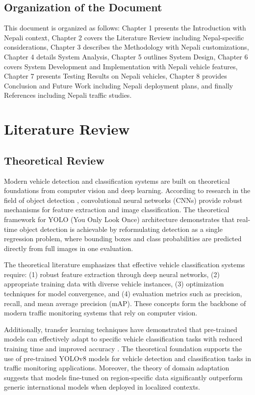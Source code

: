 \documentclass[12pt,a4paper]{report}
\begin{document}
\section{Organization of the Document}
This document is organized as follows: Chapter 1 presents the Introduction with Nepali context, Chapter 2 covers the Literature Review including Nepal-specific considerations, Chapter 3 describes the Methodology with Nepali customizations, Chapter 4 details System Analysis, Chapter 5 outlines System Design, Chapter 6 covers System Development and Implementation with Nepali vehicle features, Chapter 7 presents Testing Results on Nepali vehicles, Chapter 8 provides Conclusion and Future Work including Nepali deployment plans, and finally References including Nepali traffic studies.

\chapter{Literature Review}

\section{Theoretical Review}

Modern vehicle detection and classification systems are built on theoretical foundations from computer vision and deep learning. According to research in the field of object detection \cite{lecun2015deep}, convolutional neural networks (CNNs) provide robust mechanisms for feature extraction and image classification. The theoretical framework for YOLO (You Only Look Once) architecture \cite{redmon2016yolo} demonstrates that real-time object detection is achievable by reformulating detection as a single regression problem, where bounding boxes and class probabilities are predicted directly from full images in one evaluation.

The theoretical literature emphasizes that effective vehicle classification systems require: (1) robust feature extraction through deep neural networks, (2) appropriate training data with diverse vehicle instances, (3) optimization techniques for model convergence, and (4) evaluation metrics such as precision, recall, and mean average precision (mAP). These concepts form the backbone of modern traffic monitoring systems that rely on computer vision.

Additionally, transfer learning techniques have demonstrated that pre-trained models can effectively adapt to specific vehicle classification tasks with reduced training time and improved accuracy \cite{krizhevsky2012imagenet}. The theoretical foundation supports the use of pre-trained YOLOv8 models for vehicle detection and classification tasks in traffic monitoring applications. Moreover, the theory of domain adaptation suggests that models fine-tuned on region-specific data significantly outperform generic international models when deployed in localized contexts.
\end{document}
